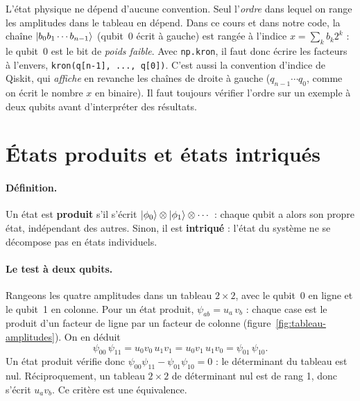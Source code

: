 \begin{piege}
L'état physique ne dépend d'aucune convention. Seul l'\emph{ordre} dans lequel on range les amplitudes dans le tableau en dépend. Dans ce cours et dans notre code, la chaîne $\lvert b_0b_1\cdots b_{n-1}\rangle$ (qubit~0 écrit à gauche) est rangée à l'indice $x=\sum_kb_k2^k$ : le qubit~0 est le bit de \emph{poids faible}. Avec \texttt{np.kron}, il faut donc écrire les facteurs à l'envers, \texttt{kron(q[n-1], ..., q[0])}. C'est aussi la convention d'indice de Qiskit, qui \emph{affiche} en revanche les chaînes de droite à gauche ($q_{n-1}\cdots q_0$, comme on écrit le nombre $x$ en binaire). Il faut toujours vérifier l'ordre sur un exemple à deux qubits avant d'interpréter des résultats.
\end{piege}

\section{États produits et états intriqués}\label{sec:intrique}
\paragraph{Définition.} Un état est \textbf{produit} s'il s'écrit $\lvert \phi_0\rangle\otimes\lvert \phi_1\rangle\otimes\cdots$ : chaque qubit a alors son propre état, indépendant des autres. Sinon, il est \textbf{intriqué} : l'état du système ne se décompose pas en états individuels.

\paragraph{Le test à deux qubits.} Rangeons les quatre amplitudes dans un tableau $2\times2$, avec le qubit~0 en ligne et le qubit~1 en colonne. Pour un état produit, $\psi_{ab}=u_a\,v_b$ : chaque case est le produit d'un facteur de ligne par un facteur de colonne (figure~\ref{fig:tableau-amplitudes}). On en déduit
\[
\psi_{00}\,\psi_{11}=u_0v_0\,u_1v_1=u_0v_1\,u_1v_0=\psi_{01}\,\psi_{10}.
\]
Un état produit vérifie donc $\psi_{00}\psi_{11}-\psi_{01}\psi_{10}=0$ : le déterminant du tableau est nul. Réciproquement, un tableau $2\times2$ de déterminant nul est de rang 1, donc s'écrit $u_av_b$. Ce critère est une équivalence.

